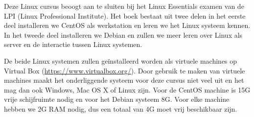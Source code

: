 Deze Linux cursus beoogt aan te sluiten bij het Linux Essentials examen van de LPI (Linux Professional Institute). Het boek bestaat uit twee delen in het eerste deel installeren we CentOS als werkstation en leren we het Linux systeem kennen. In het tweede deel installeren we Debian en zullen we meer leren over Linux als server en de interactie tussen Linux systemen.\par
De beide Linux systemen zullen ge\"installeerd worden als virtuele machines op Virtual Box (\url{https://www.virtualbox.org/}). Door gebruik te maken van virtuele machines maakt het onderliggende systeem voor deze cursus niet veel uit en het mag dan ook Windows, Mac OS X of Linux zijn. Voor de CentOS machine is 15G vrije schijfruimte nodig en voor het Debian systeem 8G. Voor elke machine hebben we 2G RAM nodig, dus een totaal van 4G moet vrij beschikbaar zijn.
